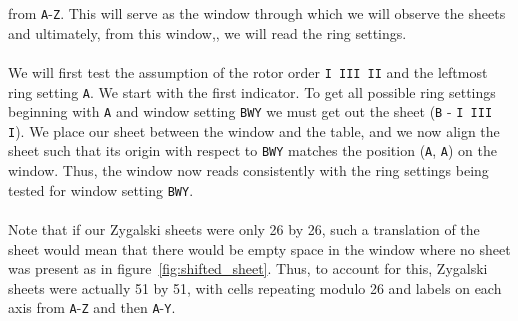 from \texttt{A}-\texttt{Z}. This will serve as the window through
which we will observe the sheets and ultimately, from this window,,
we will read the ring settings.
\\\\We will first test the assumption of
the rotor order \texttt{I III II} and the leftmost ring setting \texttt{A}.
We start with the first indicator. To get all possible ring
settings beginning with \texttt{A} and window setting \texttt{BWY} we
must get out the sheet (\texttt{B} - \texttt{I III I}). We place our
sheet between the window and the table, and we now align the sheet
such that its origin with respect to \texttt{BWY} matches the
position (\texttt{A}, \texttt{A}) on the window. Thus, the window now
reads consistently with the ring settings being tested for window
setting \texttt{BWY}.
\\\\Note that if our Zygalski sheets were only 26 by 26, such a
translation of the sheet would mean that there would be empty space
in the window where no sheet was present as in
figure~\ref{fig:shifted_sheet}. Thus, to account for this, Zygalski
sheets were actually 51 by 51, with cells repeating modulo 26 and
labels on each axis from \texttt{A}-\texttt{Z} and then \texttt{A}-\texttt{Y}.
